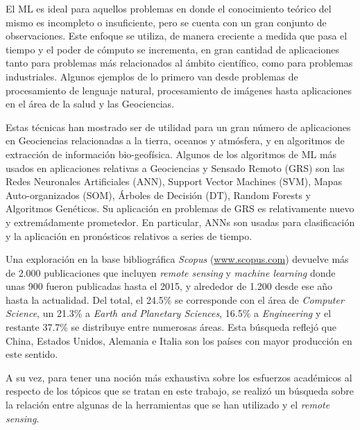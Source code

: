   \par El ML es ideal para aquellos problemas en donde el conocimiento teórico del mismo
    es incompleto o insuficiente, pero se cuenta con un gran conjunto de observaciones.
    Este enfoque se utiliza, de manera creciente a medida que pasa el tiempo y
    el poder de cómputo se incrementa, en gran cantidad de aplicaciones tanto para
    problemas más relacionados al ámbito científico, como para problemas
    industriales. Algunos ejemplos de lo primero van desde problemas de
    procesamiento de lenguaje
    natural\cite{twitt_nlp, cardellino, svm_semantic}, procesamiento de
    imágenes\cite{face_detection, corner_detection, handwritting} hasta aplicaciones
    en el área de la salud\cite{nutrition_prediction, bigdata_health, age_estimation, children}
    y las Geociencias\cite{solar_irradiation, ml_grs, modeling_mineral}.

  \par Estas técnicas han mostrado ser de utilidad para un gran número de
    aplicaciones en Geociencias relacionadas a la tierra, oceanos y atmósfera,
    y en algoritmos de extracción de información bio-geofísica.
    Algunos de los algoritmos de ML más usados en aplicaciones relativas a
    Geociencias y Sensado Remoto (GRS) son las Redes Neuronales Artificiales (ANN),
    Support Vector Machines (SVM), Mapas Auto-organizados (SOM), Árboles de Decisión (DT),
    Random Forests y Algoritmos Genéticos. Su aplicación en problemas de GRS es
    relativamente nuevo y extremádamente prometedor. En particular, ANNs son
    usadas para clasificación y la aplicación en pronósticos
    relativos a series de tiempo.

  \par Una exploración en la base bibliográfica \textit{Scopus} (\url{www.scopus.com})
    devuelve más de 2.000 publicaciones que incluyen \textit{remote sensing} y
    \textit{machine learning} donde unas 900 fueron publicadas hasta el 2015, y
    alrededor de 1.200 desde ese año hasta la actualidad. Del total, el 24.5\% se
    corresponde con el área de \textit{Computer Science}, un 21.3\% a
    \textit{Earth and Planetary Sciences}, 16.5\% a \textit{Engineering} y el
    restante 37.7\% se distribuye entre numerosas áreas. Esta búsqueda reflejó
    que China, Estados Unidos, Alemania e Italia son los países con mayor
    producción en este sentido.

  \par A su vez, para tener una noción más exhaustiva sobre los esfuerzos académicos
    al respecto de los tópicos que se tratan en este trabajo, se realizó un búsqueda
    sobre la relación entre algunas de la herramientas que se han utilizado y
    el \textit{remote sensing}.

